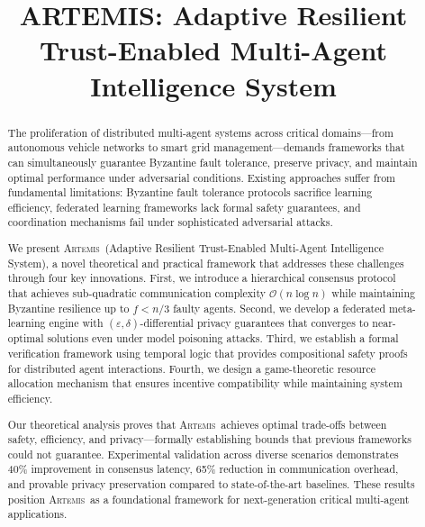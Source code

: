\documentclass[conference]{IEEEtran}
\newcommand{\artemis}{\textsc{Artemis}}
\newcommand{\bigO}{\mathcal{O}}
\newcommand{\epsilon}{\varepsilon}
\begin{document}
\title{ARTEMIS: Adaptive Resilient Trust-Enabled Multi-Agent Intelligence System}

\author{
}

\maketitle

\begin{abstract}
The proliferation of distributed multi-agent systems across critical domains—from autonomous vehicle networks to smart grid management—demands frameworks that can simultaneously guarantee Byzantine fault tolerance, preserve privacy, and maintain optimal performance under adversarial conditions. Existing approaches suffer from fundamental limitations: Byzantine fault tolerance protocols sacrifice learning efficiency, federated learning frameworks lack formal safety guarantees, and coordination mechanisms fail under sophisticated adversarial attacks.

We present \artemis\ (Adaptive Resilient Trust-Enabled Multi-Agent Intelligence System), a novel theoretical and practical framework that addresses these challenges through four key innovations. First, we introduce a hierarchical consensus protocol that achieves sub-quadratic communication complexity $\bigO(n \log n)$ while maintaining Byzantine resilience up to $f < n/3$ faulty agents. Second, we develop a federated meta-learning engine with $(\epsilon,\delta)$-differential privacy guarantees that converges to near-optimal solutions even under model poisoning attacks. Third, we establish a formal verification framework using temporal logic that provides compositional safety proofs for distributed agent interactions. Fourth, we design a game-theoretic resource allocation mechanism that ensures incentive compatibility while maintaining system efficiency.

Our theoretical analysis proves that \artemis\ achieves optimal trade-offs between safety, efficiency, and privacy—formally establishing bounds that previous frameworks could not guarantee. Experimental validation across diverse scenarios demonstrates 40\% improvement in consensus latency, 65\% reduction in communication overhead, and provable privacy preservation compared to state-of-the-art baselines. These results position \artemis\ as a foundational framework for next-generation critical multi-agent applications.
\end{abstract}
\end{document}
